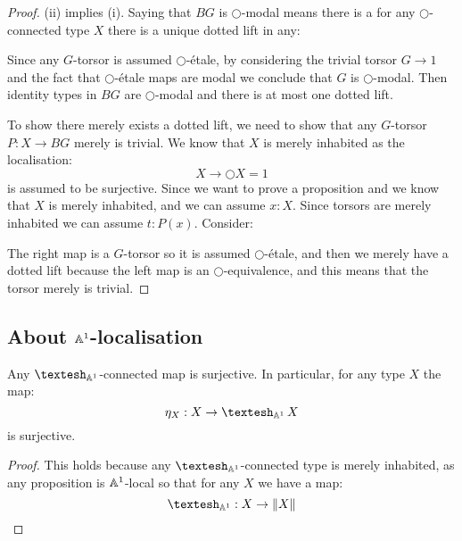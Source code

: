 \begin{proof}
  (ii) implies (i). Saying that $BG$ is $\bigcirc$-modal means there is a for any $\bigcirc$-connected type $X$ there is a unique dotted lift in any:
        \begin{center}
  \end{center}
Since any $G$-torsor is assumed $\bigcirc$-étale, by considering the trivial torsor $G\to 1$ and the fact that $\bigcirc$-étale maps are modal we conclude that $G$ is $\bigcirc$-modal. Then identity types in $BG$ are $\bigcirc$-modal and there is at most one dotted lift.
 
 To show there merely exists a dotted lift, we need to show that any $G$-torsor $P:X\to BG$ merely is trivial. We know that $X$ is merely inhabited as the localisation:
 \[X\to \bigcirc X = 1\]
 is assumed to be surjective. Since we want to prove a proposition and we know that $X$ is merely inhabited, and we can assume $x:X$. Since torsors are merely inhabited we can assume $t:P(x)$. Consider:
    \begin{center}
  \end{center}
 The right map is a $G$-torsor so it is assumed $\bigcirc$-étale, and then we merely have a dotted lift because the left map is an $\bigcirc$-equivalence, and this means that the torsor merely is trivial.
 
\end{proof}

\subsection{About $\mathbb{A}^1$-localisation}

\begin{lemma}\label{A1-replacement-surjective}
Any $\shape_{\A^1}$-connected map is surjective. In particular, for any type $X$ the map:
\[\eta_X:X\to \shape_{\A^1}X\]
is surjective.
\end{lemma}

\begin{proof}
This holds because any $\shape_{\A^1}$-connected type is merely inhabited, as any proposition is $\mathbb{A}^1$-local so that for any $X$ we have a map:
\[\shape_{\A^1}:X \to \propTrunc{X}\]
\end{proof}

